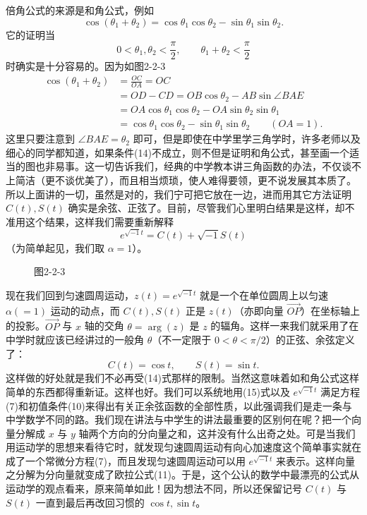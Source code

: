 倍角公式的来源是和角公式，例如
\[
\cos(\theta_1+\theta_2)=\cos\theta_1\cos\theta_2-\sin\theta_1\sin\theta_2.
\]
它的证明当
\[
0<\theta_1,\theta_2<\frac\pi2,\qquad \theta_1+\theta_2<\frac\pi2 \tag{14}
\]
时确实是十分容易的。因为如图2-2-3
\[
\begin{aligned}
\cos(\theta_1+\theta_2)&=\frac{OC}{OA}=OC\\
&=OD-CD=OB\cos\theta_2-AB\sin\angle BAE\\
&=OA\cos\theta_1\cos\theta_2-OA\sin\theta_2\sin\theta_1\\
&=\cos\theta_1\cos\theta_2-\sin\theta_1\sin\theta_2\qquad(OA=1).
\end{aligned}
\]
这里只要注意到 $\angle BAE=\theta_2$ 即可，但是即使在中学里学三角学时，许多老师以及细心的同学都知道，如果条件(14)不成立，则不但是证明和角公式，甚至画一个适当的图也非易事。这一切告诉我们，经典的中学教本讲三角函数的办法，不仅谈不上简洁（更不谈优美了），而且相当烦琐，使人难得要领，更不说发展其本质了。所以上面讲的一切，虽然是对的，我们宁可把它放在一边，进而用其它方法证明 $C(t),S(t)$ 确实是余弦、正弦了。目前，尽管我们心里明白结果是这样，却不准用这个结果，这样我们需要重新解释
\[
e^{\sqrt{-1}t}=C(t)+\sqrt{-1}S(t) \tag{15}
\]
（为简单起见，我们取 $\alpha=1$）。

\begin{figure}[htbp]
\centering
{}
\caption*{图2-2-3}
\end{figure}

现在我们回到匀速圆周运动，$z(t)=e^{\sqrt{-1}t}$ 就是一个在单位圆周上以匀速 $\alpha(=1)$ 运动的动点，而 $C(t),S(t)$ 正是 $z(t)$（亦即向量 $\overrightarrow{OP}$）在坐标轴上的投影。$\overrightarrow{OP}$ 与 $x$ 轴的交角 $\theta=\arg(z)$ 是 $z$ 的辐角。这样一来我们就采用了在中学时就应该已经讲过的一般角 $\theta$（不一定限于 $0<\theta<\pi/2$）的正弦、余弦定义了：
\[
C(t)=\cos t,\qquad S(t)=\sin t.
\]
这样做的好处就是我们不必再受(14)式那样的限制。当然这意味着如和角公式这样简单的东西都得重新证。这样也好。我们可以系统地用(15)式以及 $e^{\sqrt{-1}t}$ 满足方程(7)和初值条件(10)来得出有关正余弦函数的全部性质，以此强调我们是走一条与中学数学不同的路。我们现在讲法与中学生的讲法最重要的区别何在呢？把一个向量分解成 $x$ 与 $y$ 轴两个方向的分向量之和，这并没有什么出奇之处。可是当我们用运动学的思想来看待它时，就发现匀速圆周运动有向心加速度这个简单事实就在成了一个常微分方程(7)，而且发现匀速圆周运动可以用 $e^{\sqrt{-1}t}$ 来表示。这样向量之分解为分向量就变成了欧拉公式(11)。于是，这个公认的数学中最漂亮的公式从运动学的观点看来，原来简单如此！因为想法不同，所以还保留记号 $C(t)$ 与 $S(t)$ 一直到最后再改回习惯的 $\cos t,\sin t$。

